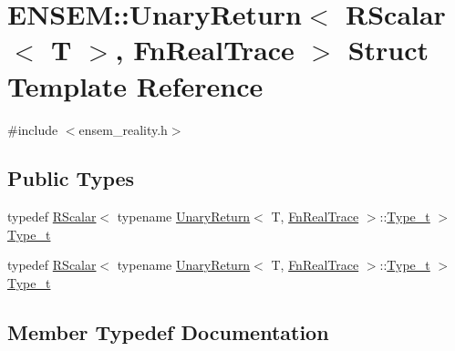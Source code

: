 \hypertarget{structENSEM_1_1UnaryReturn_3_01RScalar_3_01T_01_4_00_01FnRealTrace_01_4}{}\section{E\+N\+S\+EM\+:\+:Unary\+Return$<$ R\+Scalar$<$ T $>$, Fn\+Real\+Trace $>$ Struct Template Reference}
\label{structENSEM_1_1UnaryReturn_3_01RScalar_3_01T_01_4_00_01FnRealTrace_01_4}


{\ttfamily \#include $<$ensem\+\_\+reality.\+h$>$}

\subsection*{Public Types}
\begin{DoxyCompactItemize}
\item 
typedef \mbox{\hyperlink{classENSEM_1_1RScalar}{R\+Scalar}}$<$ typename \mbox{\hyperlink{structENSEM_1_1UnaryReturn}{Unary\+Return}}$<$ T, \mbox{\hyperlink{structENSEM_1_1FnRealTrace}{Fn\+Real\+Trace}} $>$\+::\mbox{\hyperlink{structENSEM_1_1UnaryReturn_3_01RScalar_3_01T_01_4_00_01FnRealTrace_01_4_a686ea10aaa6f33a08566c94481d3e172}{Type\+\_\+t}} $>$ \mbox{\hyperlink{structENSEM_1_1UnaryReturn_3_01RScalar_3_01T_01_4_00_01FnRealTrace_01_4_a686ea10aaa6f33a08566c94481d3e172}{Type\+\_\+t}}
\item 
typedef \mbox{\hyperlink{classENSEM_1_1RScalar}{R\+Scalar}}$<$ typename \mbox{\hyperlink{structENSEM_1_1UnaryReturn}{Unary\+Return}}$<$ T, \mbox{\hyperlink{structENSEM_1_1FnRealTrace}{Fn\+Real\+Trace}} $>$\+::\mbox{\hyperlink{structENSEM_1_1UnaryReturn_3_01RScalar_3_01T_01_4_00_01FnRealTrace_01_4_a686ea10aaa6f33a08566c94481d3e172}{Type\+\_\+t}} $>$ \mbox{\hyperlink{structENSEM_1_1UnaryReturn_3_01RScalar_3_01T_01_4_00_01FnRealTrace_01_4_a686ea10aaa6f33a08566c94481d3e172}{Type\+\_\+t}}
\end{DoxyCompactItemize}


\subsection{Member Typedef Documentation}
\mbox{\label{structENSEM_1_1UnaryReturn_3_01RScalar_3_01T_01_4_00_01FnRealTrace_01_4_a686ea10aaa6f33a08566c94481d3e172}} 
